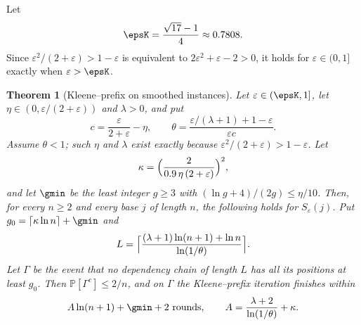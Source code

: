 \documentclass[11pt]{amsart}
\newtheorem{theorem}{Theorem}
\theoremstyle{definition}
\theoremstyle{remark}
\newcommand{\eps}{\varepsilon}
\newcommand{\PP}{\mathbb{P}}
\begin{document}
Let
\[
  \epsK=\frac{\sqrt{17}-1}{4}\approx 0.7808 .
\]
Since $\eps^2/(2+\eps)>1-\eps$ is equivalent to $2\eps^2+\eps-2>0$, it holds
for $\eps\in(0,1]$ exactly when $\eps>\epsK$.

\begin{theorem}[Kleene--prefix on smoothed instances]\label{kp:thm34}
Let $\eps\in(\epsK,1]$, let $\eta\in(0,\eps/(2+\eps))$ and $\lambda>0$, and
put
\[
  c=\frac{\eps}{2+\eps}-\eta,\qquad
  \theta=\frac{\eps/(\lambda+1)+1-\eps}{\eps c}.
\]
Assume $\theta<1$; such $\eta$ and $\lambda$ exist exactly because
$\eps^2/(2+\eps)>1-\eps$. Let
\[
  \kappa=\Bigl(\frac{2}{0.9\,\eta\,(2+\eps)}\Bigr)^2,
\]
and let $\gmin$ be the least integer $g\ge 3$ with
$(\ln g+4)/(2g)\le\eta/10$. Then, for every $n\ge 2$ and every base $j$ of
length $n$, the following holds for $S_\eps(j)$. Put
$g_0=\lceil\kappa\ln n\rceil+\gmin$ and
\[
  L=\Bigl\lceil\frac{(\lambda+1)\ln(n+1)+\ln n}{\ln(1/\theta)}\Bigr\rceil .
\]
Let $\Gamma$ be the event that no dependency chain of length $L$ has all its
positions at least $g_0$. Then $\PP[\Gamma^c]\le 2/n$, and on $\Gamma$ the
Kleene--prefix iteration finishes within
\[
  A\ln(n+1)+\gmin+2\ \text{rounds},\qquad A=\frac{\lambda+2}{\ln(1/\theta)}+\kappa .
\]
\end{theorem}
\end{document}
